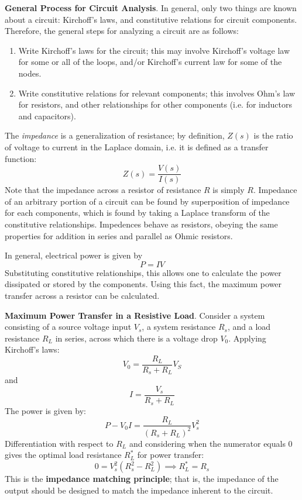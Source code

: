 \begin{framed}
    \textbf{General Process for Circuit Analysis}. In general, only two things are known about a circuit: Kirchoff's laws, and constitutive relations for circuit components. Therefore, the general steps for analyzing a circuit are as follows:
    \vspace{-1em}
    \begin{enumerate}
        \item[1.] Write Kirchoff's laws for the circuit; this may involve Kirchoff's voltage law for some or all of the loops, and/or Kirchoff's current law for some of the nodes.
        \item[2.] Write constitutive relations for relevant components; this involves Ohm's law for resistors, and other relationships for other components (i.e. for inductors and capacitors).
    \end{enumerate}
\end{framed}

The \textit{impedance} is a generalization of resistance; by definition, $Z(s)$ is the ratio of voltage to current in the Laplace domain, i.e. it is defined as a transfer function: \[Z(s) = \frac{V(s)}{I(s)}\] Note that the impedance across a resistor of resistance $R$ is simply $R$. Impedance of an arbitrary portion of a circuit can be found by superposition of impedance for each components, which is found by taking a Laplace transform of the constitutive relationships. Impedences behave as resistors, obeying the same properties for addition in series and parallel as Ohmic resistors.

In general, electrical power is given by \[P=IV\] Substituting constitutive relationships, this allows one to calculate the power dissipated or stored by the components. Using this fact, the maximum power transfer across a resistor can be calculated.

\begin{shaded}
    \textbf{Maximum Power Transfer in a Resistive Load}. Consider a system consisting of a source voltage input $V_s$, a system resistance $R_s$, and a load resistance $R_L$ in series, across which there is a voltage drop $V_0$. Applying Kirchoff's laws: \[V_0 = \frac{R_L}{R_s+R_L} V_S\] and \[I = \frac{V_s}{R_s + R_L}\] The power is given by: \[P - V_0 I = \frac{R_L}{(R_s+R_L)^2} V_s^2\] Differentiation with respect to $R_L$ and considering when the numerator equals $0$ gives the optimal load resistance $R_L^*$ for power transfer: \[0 = V_s^2 (R_s^2 - R_L^2) \implies \boxed{R_L^* = R_s}\] This is the \textbf{impedance matching principle}; that is, the impedance of the output should be designed to match the impedance inherent to the circuit.
\end{shaded}

